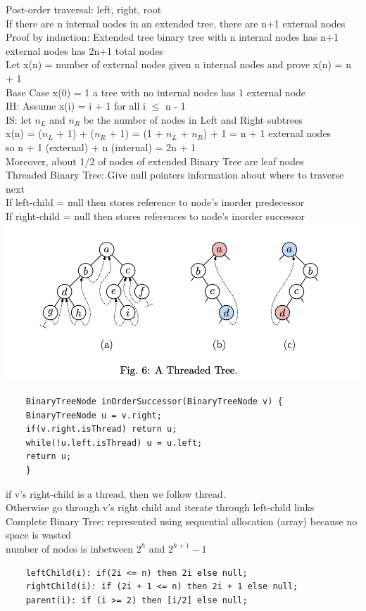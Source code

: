 \documentclass{article}
\begin{document}
  Post-order traversal: left, right, root\\
  If there are n internal nodes in an extended tree, there are n+1 external nodes \\
  \indent Proof by induction: Extended tree binary tree with n internal nodes has n+1 external nodes has 2n+1 total nodes \\
  \indent Let x(n) = number of external nodes given n internal nodes and prove x(n) = n + 1 \\
  \indent Base Case x(0) = 1 a tree with no internal nodes has 1 external node \\
  \indent IH: Assume x(i) = i + 1 for all i $\leq$ n - 1 \\
  \indent IS: let $n_{L}$ and $n_{R}$ be the number of nodes in Left and Right subtrees \\
  \indent x(n) = ($n_{L}$ + 1) + ($n_{R}$ + 1) = (1 + $n_{L}$ + $n_{R}$) + 1 = n + 1 external nodes \\
  \indent so n + 1 (external) + n (internal) = 2n + 1 \\
  \indent Moreover, about 1/2 of nodes of extended Binary Tree are leaf nodes \\
  Threaded Binary Tree: Give null pointers information about where to traverse next \\
  \indent If left-child = null then stores reference to node's inorder predecessor \\
  \indent If right-child = null then stores references to node's inorder successor \\
  \includegraphics[width=\textwidth]{Fig_6}
  \begin{lstlisting}
    BinaryTreeNode inOrderSuccessor(BinaryTreeNode v) {
    BinaryTreeNode u = v.right;
    if(v.right.isThread) return u;
    while(!u.left.isThread) u = u.left;
    return u;
    }
  \end{lstlisting}
  \indent \indent if v's right-child is a thread, then we follow thread. \\
  \indent Otherwise go through v's right child and iterate through left-child links \\
  Complete Binary Tree: represented using sequential allocation (array) because no space is wasted \\
  \indent number of nodes is inbetween $2^{h}$ and $2^{h+1}-1$
  \begin{lstlisting}
    leftChild(i): if(2i <= n) then 2i else null;
    rightChild(i): if (2i + 1 <= n) then 2i + 1 else null;
    parent(i): if (i >= 2) then [i/2] else null;
  \end{lstlisting}
  \newpage
\end{document}
